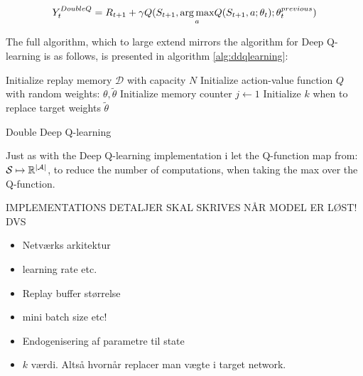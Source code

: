 \begin{equation}\label{eq:ddqn_target_final}
    Y_t^{DoubleQ} = R_{t+1} + \gamma Q(S_{t+1}, \underset{a}{\operatorname*{arg\,max}}Q(S_{t+1}, a; \theta_t); \theta_t^{previous}) 
\end{equation}

The full algorithm, which to large extend mirrors the algorithm for Deep Q-learning is as follows, is presented in algorithm \ref{alg:ddqlearning}:

\begin{algorithm}[H]
\SetAlgoLined
 Initialize replay memory $\mathcal{D}$ with capacity $N$\;
 Initialize action-value function $Q$ with random weights: $\theta, \tilde{\theta}$\;
 Initialize memory counter $j \leftarrow 1$\;
 Initialize $k$ when to replace target weights $\tilde{\theta}$\;
\caption{Double Deep Q-learning}
\label{alg:ddqlearning}
\end{algorithm}

Just as with the Deep Q-learning implementation i let the Q-function map from: $\mathcal{S} \mapsto \mathbb{R}^{\mid \mathcal{A} \mid}$, to reduce the number of computations, when taking the max over the Q-function. 

IMPLEMENTATIONS DETALJER SKAL SKRIVES NÅR MODEL ER LØST! DVS

\begin{itemize}
    \item Netværks arkitektur
    \item learning rate etc.
    \item Replay buffer størrelse
    \item mini batch size etc!
    \item Endogenisering af parametre til state
    \item $k$ værdi. Altså hvornår replacer man vægte i target network.
\end{itemize}

